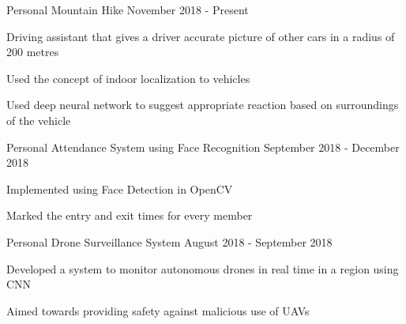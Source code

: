 \begin{cventries}
\cventry
    {Personal}
    {Mountain Hike}
    {}
    {November 2018 - Present}
    {
     \begin{cvitems} %
        \item {Driving assistant that gives a driver accurate picture of other cars in a radius of 200 metres}
        \item {Used the concept of indoor localization to vehicles}
        \item {Used deep neural network to suggest appropriate reaction based on surroundings of the vehicle}
      \end{cvitems}
    }

\cventry
    {Personal}
    {Attendance System using Face Recognition}
    {}
    {September 2018 - December 2018}
    {
     \begin{cvitems} %
        \item {Implemented using Face Detection in OpenCV}
    \item {Marked the entry and exit times for every member}
      \end{cvitems}
    }


\cventry
    {Personal}
    {Drone Surveillance System}
    {}
    {August 2018 - September 2018}
    {
     \begin{cvitems} %
        \item {Developed a system to monitor autonomous drones in real time in a region using CNN}
        \item{Aimed towards providing safety against malicious use of UAVs}
      \end{cvitems}
    }


%
\end{cventries}


